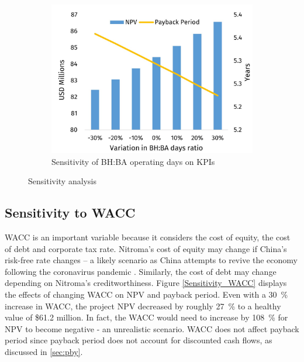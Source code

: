 \begin{figure}[h]
\begin{subfigure}[b]{.40\linewidth}
\includegraphics[width=\linewidth]{chapters/6-economics/figures/Sensitivity_OperatingDays.jpg}
\caption{Sensitivity of BH:BA operating days on KPIs}\label{Sensitivity_BHBA}
\end{subfigure}

\caption{Sensitivity analysis}
\label{Sensitivity}
\end{figure}

\subsection{Sensitivity to WACC}
WACC is an important variable because it considers the cost of equity, the cost of debt and corporate tax rate. Nitroma’s cost of equity may change if China’s risk-free rate changes – a likely scenario as China attempts to revive the economy following the coronavirus pandemic \cite{zhou_spike_2020}. Similarly, the cost of debt may change depending on Nitroma’s creditworthiness.  Figure \ref{Sensitivity_WACC} displays the effects of changing WACC on NPV and payback period. Even with a \SI{30}{\percent} increase in WACC, the project NPV decreased by roughly \SI{27}{\percent} to a healthy value of \$61.2 million. In fact, the WACC would need to increase by \SI{108}{\percent} for NPV to become negative - an unrealistic scenario. WACC does not affect payback period since payback period does not account for discounted cash flows, as discussed in \cref{sec:pby}. 


